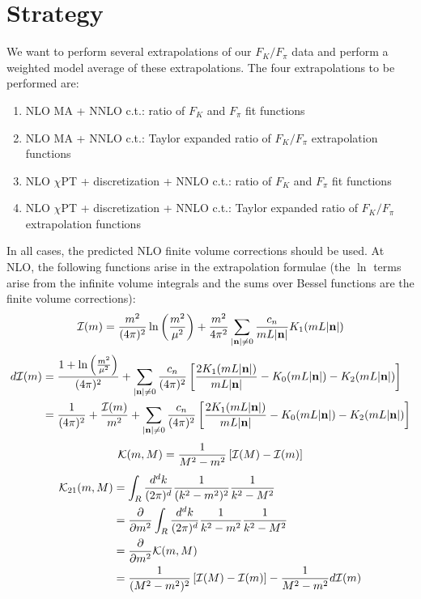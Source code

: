 \documentclass[prd,11pt,tightenlines,preprintnumbers,showpacs,superscriptaddress,notitlepage,nofootinbib,eqsecnum,floatfix]{revtex4-1}
\begin{document}
\section{Strategy}
We want to perform several extrapolations of our $F_K/F_\pi$ data and perform a weighted model average of these extrapolations.
The four extrapolations to be performed are:
\begin{enumerate}
\item NLO MA + NNLO c.t.: ratio of $F_K$ and $F_\pi$ fit functions

\item NLO MA + NNLO c.t.: Taylor expanded ratio of $F_K/F_\pi$ extrapolation functions

\item NLO $\chi$PT + discretization + NNLO c.t.: ratio of $F_K$ and $F_\pi$ fit functions

\item NLO $\chi$PT + discretization + NNLO c.t.: Taylor expanded ratio of $F_K/F_\pi$ extrapolation functions

\end{enumerate}
In all cases, the predicted NLO finite volume corrections should be used.
At NLO, the following functions arise in the extrapolation formulae (the $\ln$ terms arise from the infinite volume integrals and the sums over Bessel functions are the finite volume corrections):
\begin{equation}
{\mathcal I}(m) = \frac{m^2}{(4\pi)^2} \ln \left( \frac{m^2}{\mu^2} \right)
	+ \frac{m^2}{4\pi^2} \sum_{|\mathbf{n}|\neq0} \frac{c_n}{mL|\mathbf{n}|} K_1(mL|\mathbf{n}|)
\end{equation}
\begin{align}
d{\mathcal I}(m) &= \frac{1 + \ln \left( \frac{m^2}{\mu^2} \right)}{(4\pi)^2} 
	+\sum_{|\mathbf{n}|\neq0} \frac{c_n}{(4\pi)^2} \left[
		\frac{2K_1(mL|\mathbf{n}|)}{mL|\mathbf{n}|}
		-K_0(mL|\mathbf{n}|)
		-K_2(mL|\mathbf{n}|)
	\right]
\nonumber\\&=
	\frac{1}{(4\pi)^2} + \frac{{\mathcal I}(m)}{m^2}
	+\sum_{|\mathbf{n}|\neq0} \frac{c_n}{(4\pi)^2} \left[
		\frac{2K_1(mL|\mathbf{n}|)}{mL|\mathbf{n}|}
		-K_0(mL|\mathbf{n}|)
		-K_2(mL|\mathbf{n}|)
	\right]
\end{align}
\begin{equation}
{\mathcal K}(m,M) = \frac{1}{M^2 - m^2} \left[ {\mathcal I}(M) - {\mathcal I}(m) \right]
\end{equation}
\begin{align}
{\mathcal K}_{21}(m,M) &= \int_R \frac{d^d k}{(2\pi)^d} \frac{1}{(k^2 -m^2)^2} \frac{1}{k^2 - M^2}
\nonumber\\&=
	\frac{\partial}{\partial m^2} \int_R \frac{d^d k}{(2\pi)^d} \frac{1}{k^2 -m^2} \frac{1}{k^2 - M^2}
\nonumber\\&=
	\frac{\partial}{\partial m^2} {\mathcal K}(m,M)
\nonumber\\&=
	\frac{1}{(M^2 - m^2)^2} \left[ {\mathcal I}(M) - {\mathcal I}(m) \right]
	-\frac{1}{M^2 - m^2} d{\mathcal I}(m)
\end{align}
\end{document}
